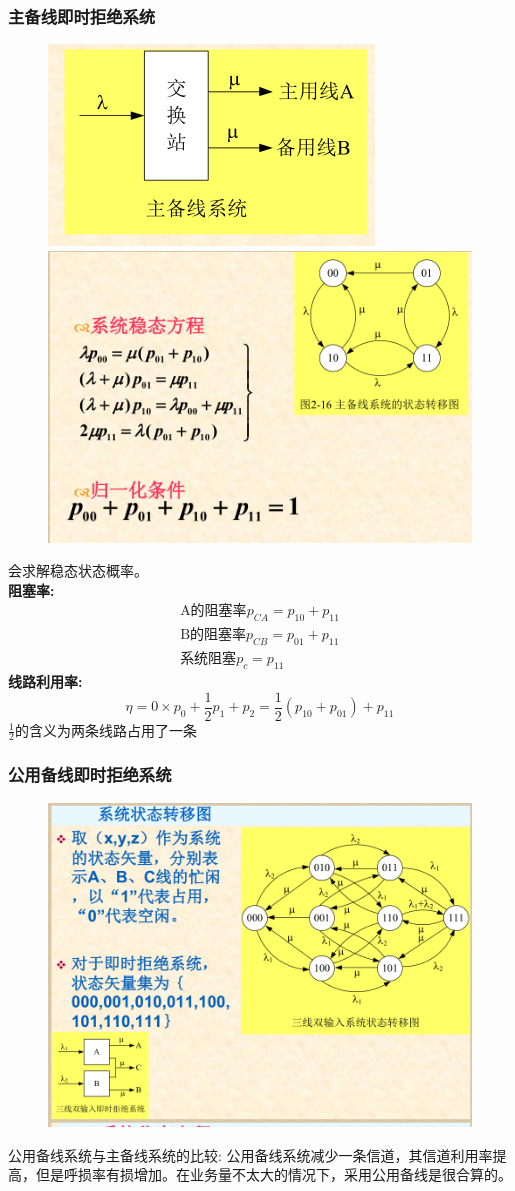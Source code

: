 \subsubsection{主备线即时拒绝系统}
\begin{figure}[H]
	\centering	
		\includegraphics[width=0.4\linewidth]{figures/prove_12}
		\\	\includegraphics[width=0.5\linewidth]{figures/prove_8}
	\caption{}
	\label{fig:prove8}
\end{figure}
会求解稳态状态概率。\\
\textbf{阻塞率:}
\begin{gather}\label{key}
\text{A的阻塞率}p_{CA} = p_{10}+p_{11} \\
\text{B的阻塞率}p_{CB} = p_{01}+p_{11} \\
\text{系统阻塞}p_{c} = p_{11}
\end{gather}
\textbf{线路利用率:}
\begin{equation}\label{key}
\eta = 0\times p_0 + \frac{1}{2}p_1 + p_2 = \frac{1}{2}(p_{10}+p_{01})+p_{11}
\end{equation}
$ \frac{1}{2} $的含义为两条线路占用了一条
\subsubsection{公用备线即时拒绝系统}
\begin{figure}[H]
	\centering
	\includegraphics[width=0.5\linewidth]{figures/prove_9}
	\caption{}
	\label{fig:prove9}
\end{figure}
公用备线系统与主备线系统的比较:
公用备线系统减少一条信道，其信道利用率提高，但是呼损率有损增加。在业务量不太大的情况下，采用公用备线是很合算的。
